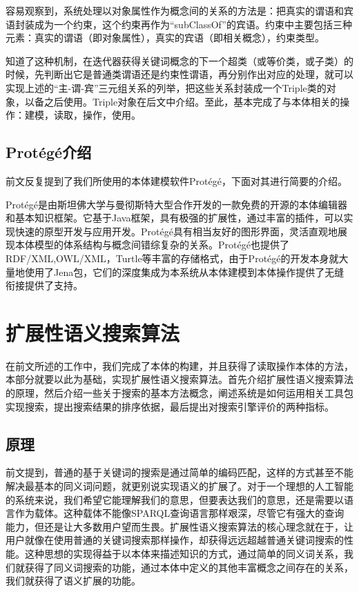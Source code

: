 \documentclass[12pt,a4paper]{article}
\begin{document}
	容易观察到，系统处理以对象属性作为概念间的关系的方法是：把真实的谓语和宾语封装成为一个约束，这个约束再作为“subClassOf”的宾语。约束中主要包括三种元素：真实的谓语（即对象属性），真实的宾语（即相关概念），约束类型。
	
	知道了这种机制，在迭代器获得关键词概念的下一个超类（或等价类，或子类）的时候，先判断出它是普通类谓语还是约束性谓语，再分别作出对应的处理，就可以实现上述的“主-谓-宾”三元组关系的列举，把这些关系封装成一个Triple类的对象，以备之后使用。Triple对象在后文中介绍。至此，基本完成了与本体相关的操作：建模，读取，操作，使用。	
	
	\subsection{Prot{\'e}g{\'e}介绍}	
	前文反复提到了我们所使用的本体建模软件Prot{\'e}g{\'e}，下面对其进行简要的介绍。
	
	Prot{\'e}g{\'e}是由斯坦佛大学与曼彻斯特大型合作开发的一款免费的开源的本体编辑器和基本知识框架。它基于Java框架，具有极强的扩展性，通过丰富的插件，可以实现快速的原型开发与应用开发。Prot{\'e}g{\'e}具有相当友好的图形界面，灵活直观地展现本体模型的体系结构与概念间错综复杂的关系。Prot{\'e}g{\'e}也提供了RDF/XML,OWL/XML，Turtle等丰富的存储格式，由于Prot{\'e}g{\'e}的开发本身就大量地使用了Jena包，它们的深度集成为本系统从本体建模到本体操作提供了无缝衔接提供了支持。
	
\section{扩展性语义搜索算法}
	
	在前文所述的工作中，我们完成了本体的构建，并且获得了读取操作本体的方法，本部分就要以此为基础，实现扩展性语义搜索算法。首先介绍扩展性语义搜索算法的原理，然后介绍一些关于搜索的基本方法概念，阐述系统是如何运用相关工具包实现搜索，提出搜索结果的排序依据，最后提出对搜索引擎评价的两种指标。
	\subsection{原理}
	
	前文提到，普通的基于关键词的搜索是通过简单的编码匹配，这样的方式甚至不能解决最基本的同义词问题，就更别说实现语义的扩展了。对于一个理想的人工智能的系统来说，我们希望它能理解我们的意思，但要表达我们的意思，还是需要以语言作为载体。这种载体不能像SPARQL查询语言那样艰深，尽管它有强大的查询能力，但还是让大多数用户望而生畏。扩展性语义搜索算法的核心理念就在于，让用户就像在使用普通的关键词搜索那样操作，却获得远远超越普通关键词搜索的性能。这种思想的实现得益于以本体来描述知识的方式，通过简单的同义词关系，我们就获得了同义词搜索的功能，通过本体中定义的其他丰富概念之间存在的关系，我们就获得了语义扩展的功能。
	
\end{document}
